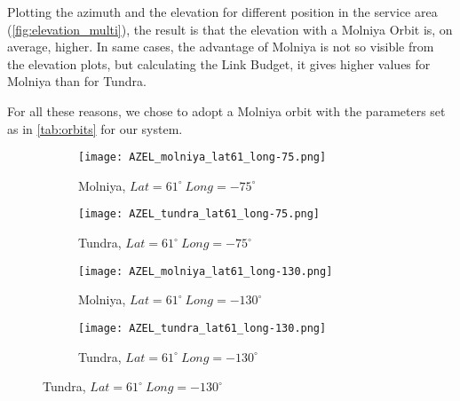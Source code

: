 Plotting the azimuth and the elevation for different position in the service area (\autoref{fig:elevation_multi}), the result is that the elevation with a Molniya Orbit is, on average, higher. In same cases, the advantage of Molniya is not so visible from the elevation plots, but calculating the Link Budget, it gives higher values for Molniya than for Tundra.

For all these reasons, we chose to adopt a Molniya orbit with the parameters set as in \autoref{tab:orbits} for our system.

\begin{figure}[!htbp]
	\begin{subfigure}{.5\textwidth}
	\centering
	\texttt{[image: AZEL\_molniya\_lat61\_long-75.png]}
	\caption{Molniya, $Lat = 61^\circ ~ Long = -75^\circ$}
	\end{subfigure}
	\begin{subfigure}{.5\textwidth}
	\centering
	\texttt{[image: AZEL\_tundra\_lat61\_long-75.png]}
	\caption{Tundra, $Lat = 61^\circ ~ Long = -75^\circ$}
	\end{subfigure}
	\vspace{0.5cm}
	\begin{subfigure}{.5\textwidth}
	\centering
	\texttt{[image: AZEL\_molniya\_lat61\_long-130.png]}
	\caption{Molniya, $Lat = 61^\circ ~ Long = -130^\circ$}
	\end{subfigure}
	\begin{subfigure}{.5\textwidth}
	\centering
	\texttt{[image: AZEL\_tundra\_lat61\_long-130.png]}
	\caption{Tundra, $Lat = 61^\circ ~ Long = -130^\circ$}
	\end{subfigure}
	\end{figure}
